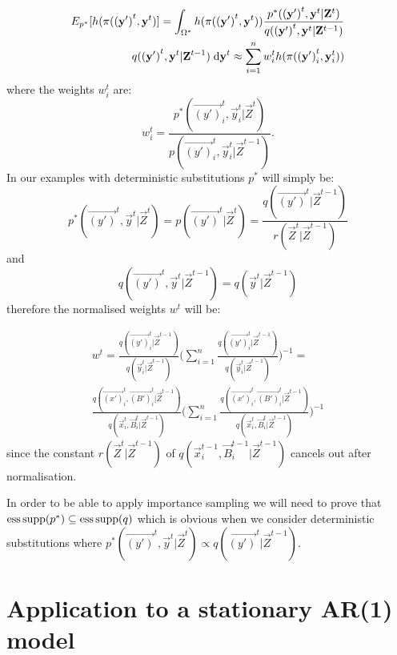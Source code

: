 \begin{align*}
    E_{p^*}[h(\pi (\mathbf{(y')}^{t}, \mathbf{y}^{t})] = \int_{\Omega^*} h(\pi(\mathbf{(y')}^{t}, \mathbf{y}^{t})) \frac{p^*(\mathbf{(y')}^{t}, \mathbf{y}^{t}|\mathbf{Z}^{t})} {q(\mathbf{(y')}^{t}, \mathbf{y}^{t} | \mathbf{Z}^{t-1})} \\
    q(\mathbf{(y')}^{t}, \mathbf{y}^{t} | \mathbf{Z}^{t-1}) \; \mathrm{d} \mathbf{y}^{t} \approx \sum_{i=1}^n  w^{t}_i h(\pi (\mathbf{(y')}^{t}_i, \mathbf{y}^{t}_i))
\end{align*}
where the weights $w^{t}_i$ are:
\begin{equation*}
    w^{t}_i = \frac{p^*(\vec{(y')}^{t}_i, \vec{y}^{t}_i | \vec{Z}^{t})} {p(\vec{(y')}^{t}_i, \vec{y}^{t}_i|\vec{Z}^{t-1})}.
\end{equation*}
In our examples with deterministic substitutions $p^*$ will simply be:
\begin{equation*}
    p^*(\vec{(y')}^{t}, \vec{y}^{t} | \vec{Z}^{t}) = p(\vec{(y')}^{t} | \vec{Z}^{t}) = \frac{ q(\vec{(y')}^{t}|\vec{Z}^{t-1})} {r(\vec{Z}^{t} | \vec{Z}^{t-1})}
\end{equation*}
and
\begin{equation*}
    q(\vec{(y')}^{t}, \vec{y}^{t} | \vec{Z}^{t-1}) = q(\vec{y}^{t} | \vec{Z}^{t-1})
\end{equation*}
therefore the normalised weights $w^t$ will be:

\begin{multline*}
    w^{t} = \frac{q(\vec{(y')}^{t}_i | \vec{Z}^{t-1}) }{q(\vec{y}^{t}_i | \vec{Z}^{t-1})}\Bigg( \sum_{i=1}^n  \frac{q(\vec{(y')}^{t}_i | \vec{Z}^{t-1}) }{q(\vec{y}^{t}_i | \vec{Z}^{t-1})}\Bigg)^{-1} = \\
    \frac{q(\vec{(x')}^{t}_i, \vec{(B')}^{t}_i | \vec{Z}^{t-1}) }{q(\vec{x}^{t}_i, \vec{B}^{t}_i | \vec{Z}^{t-1})}\Bigg( \sum_{i=1}^n \frac{q(\vec{(x')}^{t}_i, \vec{(B')}^{t}_i | \vec{Z}^{t-1}) }{q(\vec{x}^{t}_i, \vec{B}^{t}_i | \vec{Z}^{t-1})}\Bigg)^{-1}
\end{multline*}
since the constant $r(\vec{Z}^t | \vec{Z}^{t-1})$ of $q(\vec{x}^{t-1}_i,\vec{B}^{t-1}_i | \vec{Z}^{t-1})$ cancels out after normalisation.

In order to be able to apply importance sampling we will need to prove that $\operatorname{ess\,supp}(p^*) \subseteq \operatorname{ess\,supp}(q)$
which is obvious when we consider deterministic substitutions where $p^*(\vec{(y')}^{t}, \vec{y}^{t} | \vec{Z}^{t}) \propto q(\vec{(y')}^{t}|\vec{Z}^{t-1})$.

\section{Application to a stationary AR(1) model}
\label{sec:3}

